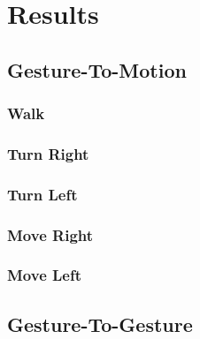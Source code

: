 \chapter{Results}
\section{Gesture-To-Motion}
\subsection{Walk}

\clearpage

\subsection{Turn Right}

\clearpage

\subsection{Turn Left}

\clearpage

\subsection{Move Right}

\clearpage

\subsection{Move Left}

\clearpage

\section{Gesture-To-Gesture}
%


%
